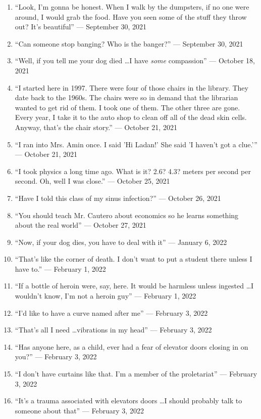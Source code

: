 \documentclass[12pt]{article}
\begin{document}
\begin{enumerate}
  \item “Look, I'm gonna be honest. When I walk by the dumpsters, if no one were around, I would grab the food. Have you seen some of the stuff they throw out? It's beautiful” — September 30, 2021

  \item “Can someone stop banging? Who is the banger?” — September 30, 2021

  \item “Well, if you tell me your dog died \dots I have \textit{some} compassion” — October 18, 2021

  \item “I started here in 1997. There were four of those chairs in the library. They date back to the 1960s. The chairs were so in demand that the librarian wanted to get rid of them. I took one of them. The other three are gone. Every year, I take it to the auto shop to clean off all of the dead skin cells. Anyway, that's the chair story.” — October 21, 2021

  \item “I ran into Mrs. Amin once. I said 'Hi Ladan!' She said 'I haven't got a clue.'” — October 21, 2021 

  \item “I took physics a long time ago. What is it? 2.6? 4.3? meters per second per second. Oh, well I was close.” — October 25, 2021

  \item “Have I told this class of my sinus infection?” — October 26, 2021

  \item “You should teach Mr. Cautero about economics so he learns something about the real world” — October 27, 2021


  \item “Now, if your dog dies, you have to deal with it” — January 6, 2022

  \item “That's like the corner of death. I don't want to put a student there unless I have to.” — February 1, 2022

  \item ``If a bottle of heroin were, say, here. It would be harmless unless ingested \dots I wouldn't know, I'm not a heroin guy'' — February 1, 2022

  \item “I'd like to have a curve named after me” — February 3, 2022

  \item “That's all I need \dots vibrations in my head” — February 3, 2022

  \item “Has anyone here, as a child, ever had a fear of elevator doors closing in on you?” — February 3, 2022

  \item “I don't have curtains like that. I'm a member of the proletariat” — February 3, 2022

  \item “It's a trauma associated with elevators doors \dots I should probably talk to someone about that” — February 3, 2022

\end{enumerate}
\end{document}
